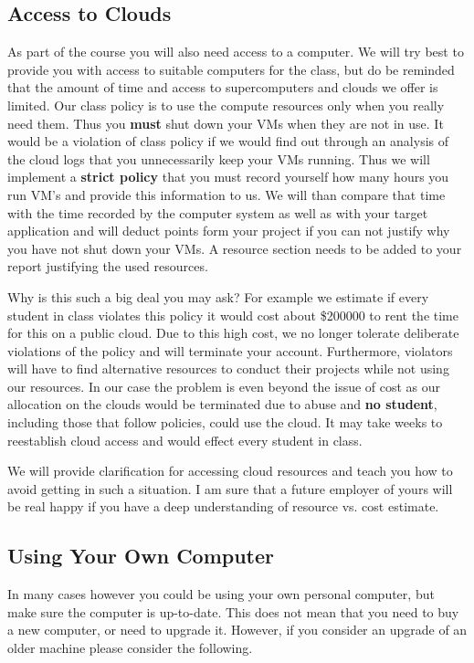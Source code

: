 \subsection{Access to Clouds}

As part of the course you will also need access to a computer. We will
try best to provide you with access to suitable computers for the class,
but do be reminded that the amount of time and access to supercomputers
and clouds we offer is limited. Our class policy is to use the compute
resources only when you really need them. Thus you \textbf{must} shut
down your VMs when they are not in use. It would be a violation of class
policy if we would find out through an analysis of the cloud logs that
you unnecessarily keep your VMs running. Thus we will implement a
\textbf{strict policy} that you must record yourself how many hours you
run VM's and provide this information to us. We will than compare that
time with the time recorded by the computer system as well as with your
target application and will deduct points form your project if you can
not justify why you have not shut down your VMs. A resource section
needs to be added to your report justifying the used resources.

Why is this such a big deal you may ask? For example we estimate if
every student in class violates this policy it would cost about \$200000
to rent the time for this on a public cloud. Due to this high cost, we
no longer tolerate deliberate violations of the policy and will
terminate your account. Furthermore, violators will have to find
alternative resources to conduct their projects while not using our
resources. In our case the problem is even beyond the issue of cost as
our allocation on the clouds would be terminated due to abuse and
\textbf{no student}, including those that follow policies, could use the
cloud. It may take weeks to reestablish cloud access and would effect
every student in class.

We will provide clarification for accessing cloud resources and teach
you how to avoid getting in such a situation. I am sure that a future
employer of yours will be real happy if you have a deep understanding of
resource vs. cost estimate.

\subsection{Using Your Own Computer}

In many cases however you could be using your own personal computer, but
make sure the computer is up-to-date. This does not mean that you need
to buy a new computer, or need to upgrade it. However, if you consider
an upgrade of an older machine please consider the following.


